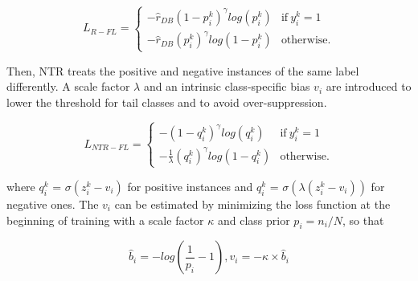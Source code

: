 \documentclass[11pt]{article}
\begin{document}
\begin{comment}
\small
\begin{equation}
L_{R-FL} = -\hat{r}_{DB}[y_{i}^{k}(1-p_{i}^{k})log(p_{i}^{k}) +(1-y_{i}^{k}) p_{i}^{k}log(1-p_{i}^{k}) ]
\end{equation}
\normalsize
\end{comment}


\small
  \begin{equation}
    L_{R-FL}=
    \begin{cases}
      -\hat{r}_{DB} (1-p_{i}^{k})^{\gamma}log(p_{i}^{k}) & \text{if}\ y_{i}^{k}=1 \\
      -\hat{r}_{DB} {(p_{i}^{k})}^{\gamma}log(1-p_{i}^{k}) & \text{otherwise.}
    \end{cases}
  \end{equation}
\normalsize


Then, NTR treats the positive and negative instances of the same label differently. A scale factor $\lambda$ and an intrinsic class-specific bias $v_i$ are introduced to lower the threshold for tail classes and to avoid over-suppression. 

\begin{comment}
\small
\begin{equation}
L_{NTR-FL} = -[y_{i}^{k}(1-q_{i}^{k})log(q_{i}^{k}) + \frac{1}{\lambda} (1-y_{i}^{k}) q_{i}^{k}log(1-q_{i}^{k}) ]
\end{equation}
\normalsize
\end{comment}

\small
  \begin{equation}
    L_{NTR-FL}=
    \begin{cases}
      -(1-q_{i}^{k})^{\gamma}log(q_{i}^{k}) & \text{if}\ y_{i}^{k}=1 \\
      -\frac{1}{\lambda} {(q_{i}^{k})}^{\gamma}log(1-q_{i}^{k}) & \text{otherwise.}
    \end{cases}
  \end{equation}
\normalsize


where $q_{i}^{k}$ = $\sigma(z_{i}^{k}-v_{i})$ for positive instances and $q_{i}^{k}$ = $\sigma(\lambda (z_{i}^{k}-v_{i}))$ for negative ones.
The $v_{i}$ can be estimated by minimizing the loss function at the beginning of training with a scale factor $\kappa$ and class prior $p_{i} = n_{i}/N$, so that 

\small
\begin{equation}
\hat{b}_{i} = -log(\frac{1}{p_i}-1), v_i = -\kappa \times \hat{b}_{i}
\end{equation}
\normalsize
\end{document}
